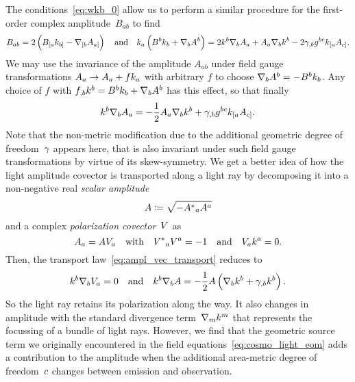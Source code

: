 The conditions~\eqref{eq:wkb_0} allow us to perform a similar procedure for the first-order complex amplitude~$B_{ab}$ to find
\begin{equation}
	B_{ab}=2\left(B_{[ a}k_{b]}-\nabla_{[ b}A_{a]}\right) \quad \text{and} \quad k_a\left(B^bk_b+\nabla_bA^b\right)=2k^b\nabla_bA_a+A_a\nabla_bk^b-2\gamma_{,b}g^{bc}k_{[ a}A_{c]}
		\mathpunct{.}
\end{equation}
We may use the invariance of the amplitude $A_{ab}$ under field gauge transformations $A_a\rightarrow A_a+fk_a$ with arbitrary $f$ to choose $\nabla_bA^b=-B^bk_b$. Any choice of $f$ with $f_{,b}k^b=B^bk_b+\nabla_bA^b$ has this effect, so that finally
\begin{equation}\label{eq:ampl_vec_transport}
	k^b\nabla_bA_a=-\frac{1}{2}A_a\nabla_bk^b+\gamma_{,b}g^{bc}k_{[ a}A_{c]}
	\mathpunct{.}
\end{equation}
Note that the non-metric modification due to the additional geometric degree of freedom~$\gamma$ appears here, that is also invariant under such field gauge transformations by virtue of its skew-symmetry. We get a better idea of how the light amplitude covector is transported along a light ray by decomposing it into a non-negative real \emph{scalar amplitude}
\begin{equation}\label{eq:scalampl}
	A\coloneqq\sqrt{-{{A}^{*}}_a A^a}
\end{equation}
and a complex \emph{polarization covector}~$V$ as
\begin{equation}\label{eq:amplitude_transport}
	A_a=AV_a \quad \text{with} \quad {{V}^{*}}_aV^a=-1 \quad \text{and} \quad V_ak^a=0
	\mathpunct{.}
\end{equation}
Then, the transport law~\eqref{eq:ampl_vec_transport} reduces to
\begin{equation}
	k^b\nabla_bV_a=0 \quad \text{and} \quad k^b\nabla_bA=-\frac{1}{2}A\left(\nabla_bk^b+\gamma_{,b}k^b\right)
	\mathpunct{.}
\end{equation}
So the light ray retains its polarization along the way. It also changes in amplitude with the standard divergence term~$\nabla_mk^m$ that represents the focussing of a bundle of light rays. However, we find that the geometric source term we originally encountered in the field equations~\eqref{eq:cosmo_light_eom} adds a contribution to the amplitude when the additional area-metric degree of freedom~$c$ changes between emission and observation.

